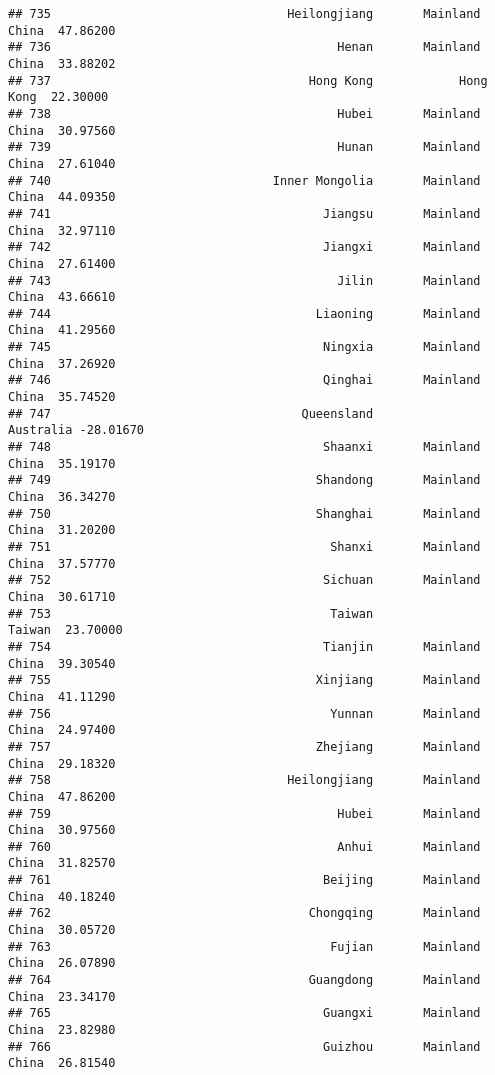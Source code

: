 \documentclass[
]{article}
\begin{document}
\begin{verbatim}
## 735                                 Heilongjiang       Mainland China  47.86200
## 736                                        Henan       Mainland China  33.88202
## 737                                    Hong Kong            Hong Kong  22.30000
## 738                                        Hubei       Mainland China  30.97560
## 739                                        Hunan       Mainland China  27.61040
## 740                               Inner Mongolia       Mainland China  44.09350
## 741                                      Jiangsu       Mainland China  32.97110
## 742                                      Jiangxi       Mainland China  27.61400
## 743                                        Jilin       Mainland China  43.66610
## 744                                     Liaoning       Mainland China  41.29560
## 745                                      Ningxia       Mainland China  37.26920
## 746                                      Qinghai       Mainland China  35.74520
## 747                                   Queensland            Australia -28.01670
## 748                                      Shaanxi       Mainland China  35.19170
## 749                                     Shandong       Mainland China  36.34270
## 750                                     Shanghai       Mainland China  31.20200
## 751                                       Shanxi       Mainland China  37.57770
## 752                                      Sichuan       Mainland China  30.61710
## 753                                       Taiwan               Taiwan  23.70000
## 754                                      Tianjin       Mainland China  39.30540
## 755                                     Xinjiang       Mainland China  41.11290
## 756                                       Yunnan       Mainland China  24.97400
## 757                                     Zhejiang       Mainland China  29.18320
## 758                                 Heilongjiang       Mainland China  47.86200
## 759                                        Hubei       Mainland China  30.97560
## 760                                        Anhui       Mainland China  31.82570
## 761                                      Beijing       Mainland China  40.18240
## 762                                    Chongqing       Mainland China  30.05720
## 763                                       Fujian       Mainland China  26.07890
## 764                                    Guangdong       Mainland China  23.34170
## 765                                      Guangxi       Mainland China  23.82980
## 766                                      Guizhou       Mainland China  26.81540

\end{verbatim}
\end{document}
